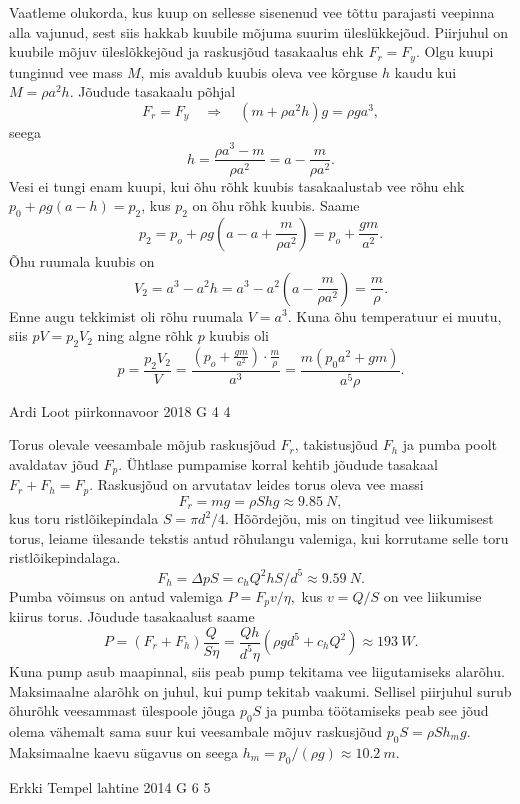 \documentclass[11pt]{article}
\begin{document}
{{\ifSolution
Vaatleme olukorda, kus kuup on sellesse sisenenud vee tõttu parajasti veepinna alla vajunud, sest siis hakkab kuubile mõjuma suurim üleslükkejõud. Piirjuhul on kuubile mõjuv üleslõkkejõud ja raskusjõud tasakaalus ehk $F_r = F_y$. Olgu kuupi tunginud vee mass $M$, mis avaldub kuubis oleva vee kõrguse $h$ kaudu kui $M = \rho a^2h$. Jõudude tasakaalu põhjal
\[
F_r = F_y \quad\Rightarrow\quad (m + \rho a^2h)g=\rho ga^3,
\]
seega
\[
h = \frac{\rho a^3 - m}{\rho a^2} = a - \frac{m}{\rho a^2}.
\]
Vesi ei tungi enam kuupi, kui õhu rõhk kuubis tasakaalustab vee rõhu ehk $p_0 + \rho g(a-h) = p_2$, kus $p_2$ on õhu rõhk kuubis. Saame
\[
p_2 = p_o + \rho g\left(a - a + \frac{m}{\rho a^2}\right) = p_o + \frac{gm}{a^2}.
\]
Õhu ruumala kuubis on
\[
V_2 = a^3 - a^2h = a^3 - a^2\left(a - \frac{m}{\rho a^2}\right) = \frac{m}{\rho}.
\]
Enne augu tekkimist oli rõhu ruumala $V=a^3$. Kuna õhu temperatuur ei muutu, siis $pV = p_2V_2$ ning algne rõhk $p$ kuubis oli
\[
p = \frac{p_2V_2}{V} = \frac{ \left( p_o + \frac{gm}{a^2} \right) \cdot \frac{m}{\rho}}{a^3} = \frac{m(p_0a^2 + gm)}{a^5\rho}.
\]
\fi
}

{Ardi Loot} %
{piirkonnavoor} %
{2018} %
{G 4} %
{4} %
{

\ifSolution
\osa Torus olevale veesambale mõjub raskusjõud $F_{r}$, takistusjõud $F_{h}$
ja pumba poolt avaldatav jõud $F_{p}$. Ühtlase pumpamise korral
kehtib jõudude tasakaal $F_{r}+F_{h}=F_{p}$. Raskusjõud on
arvutatav leides torus oleva vee massi
\[
F_{r}=mg=\rho Shg\approx\SI{9.85}{N},
\]
kus toru ristlõikepindala $S=\pi d^{2}/4.$ Hõõrdejõu, mis
on tingitud vee liikumisest torus, leiame ülesande tekstis antud rõhulangu
valemiga, kui korrutame selle toru ristlõikepindalaga.
\[
F_{h}=\Delta pS=c_{h}Q^{2}hS/d^{5}\approx\SI{9.59}{N}.
\]
Pumba võimsus on antud valemiga $P=F_{p}v/\eta,$ kus $v=Q/S$
on vee liikumise kiirus torus. Jõudude tasakaalust saame
\[
P=\left(F_{r}+F_{h}\right)\frac{Q}{S\eta}=\frac{Qh}{d^{5}\eta}\left(\rho gd^{5}+c_{h}Q^{2}\right)\approx\SI{193}{W}.
\]
\osa Kuna pump asub maapinnal, siis peab pump tekitama vee liigutamiseks
alarõhu. Maksimaalne alarõhk on juhul, kui pump tekitab vaakumi.
Sellisel piirjuhul surub õhurõhk veesammast ülespoole jõuga $p_{0}S$
ja pumba töötamiseks peab see jõud olema vähemalt sama suur kui veesambale
mõjuv raskusjõud $p_{0}S=\rho Sh_{m}g.$ Maksimaalne kaevu sügavus
on seega $h_{m}=p_{0}/\left(\rho g\right)\approx\SI{10.2}{m}$.
\fi
}

{Erkki Tempel} %
{lahtine} %
{2014} %
{G 6} %
{5} %
{

}}
\end{document}
